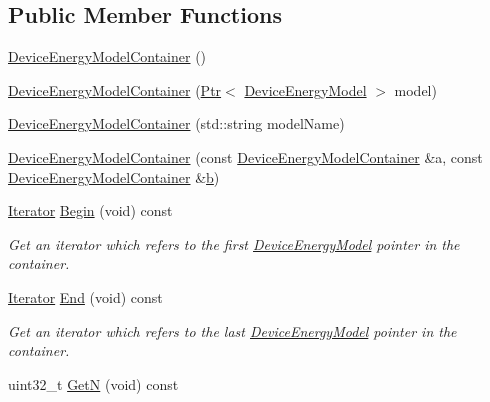 \subsection*{Public Member Functions}
\begin{DoxyCompactItemize}
\item 
\hyperlink{classns3_1_1DeviceEnergyModelContainer_a0793cce511ec65cd636606eea2b318d7}{Device\+Energy\+Model\+Container} ()
\item 
\hyperlink{classns3_1_1DeviceEnergyModelContainer_a50c31110b14ebc3eb5a43db2e80e91fa}{Device\+Energy\+Model\+Container} (\hyperlink{classns3_1_1Ptr}{Ptr}$<$ \hyperlink{classns3_1_1DeviceEnergyModel}{Device\+Energy\+Model} $>$ model)
\item 
\hyperlink{classns3_1_1DeviceEnergyModelContainer_aa5a4d5749bc0ca30aed93351ddfacb4f}{Device\+Energy\+Model\+Container} (std\+::string model\+Name)
\item 
\hyperlink{classns3_1_1DeviceEnergyModelContainer_ab66ed2cb3466eb3f379e90b8c3ef220b}{Device\+Energy\+Model\+Container} (const \hyperlink{classns3_1_1DeviceEnergyModelContainer}{Device\+Energy\+Model\+Container} \&a, const \hyperlink{classns3_1_1DeviceEnergyModelContainer}{Device\+Energy\+Model\+Container} \&\hyperlink{lte__pathloss_8m_a21ad0bd836b90d08f4cf640b4c298e7c}{b})
\item 
\hyperlink{classns3_1_1DeviceEnergyModelContainer_a7e8b57fa36903db5c468cc8a8e00af3b}{Iterator} \hyperlink{classns3_1_1DeviceEnergyModelContainer_a4fe48a4bd94d73c3e8966771a4c23b11}{Begin} (void) const 
\begin{DoxyCompactList}\small\item\em Get an iterator which refers to the first \hyperlink{classns3_1_1DeviceEnergyModel}{Device\+Energy\+Model} pointer in the container. \end{DoxyCompactList}\item 
\hyperlink{classns3_1_1DeviceEnergyModelContainer_a7e8b57fa36903db5c468cc8a8e00af3b}{Iterator} \hyperlink{classns3_1_1DeviceEnergyModelContainer_a2cedd9f88ba5587150d09d1e230cd4be}{End} (void) const 
\begin{DoxyCompactList}\small\item\em Get an iterator which refers to the last \hyperlink{classns3_1_1DeviceEnergyModel}{Device\+Energy\+Model} pointer in the container. \end{DoxyCompactList}\item 
uint32\+\_\+t \hyperlink{classns3_1_1DeviceEnergyModelContainer_a025e2ac459646ce218645a5f9329a3fa}{GetN} (void) const 

\end{DoxyCompactItemize}

